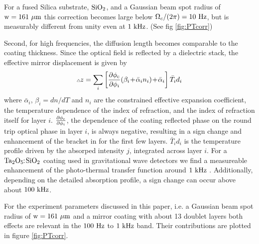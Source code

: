 For a fused Silica substrate, $\rm SiO_2$,  and a Gaussian beam spot radius of ${\rm w}=161~\mu{\rm m}$ this correction becomes large below ${{\Omega}}_c/(2 \pi) = 10~{\rm Hz}$, but is measurably different from unity even at $1~{\rm kHz}$. (See fig \ref{fig:PTcorr})

Second, for high frequencies, the diffusion length becomes comparable to the coating thickness. Since the optical field is reflected by a dielectric stack, the effective mirror displacement is given by \cite{PhysRevD.78.102003,PhysRevD.91.023010}
\begin{equation}
\label{eq:dphic2}
{}_{{}^\triangle}\! z =  \sum_{i}   \left[ \frac{\partial \phi_{\rm c}}{\partial \phi_i} (\beta_i \!+\! \bar{\alpha}_i n_i) 
\!+\!  \bar{\alpha}_i  \right]  \bar{T}_i d_i
\end{equation}
where  $\bar{\alpha}_i$, $\beta_i=dn/dT$ and $n_i$ are the constrained effective expansion coefficient, the temperature dependence of the index of refraction, and the index of refraction itself for layer $i$. $\frac{\partial \phi_{\rm c}}{\partial \phi_i}$, the dependence of the coating reflected phase on the round trip optical phase in layer $i$, is always negative, resulting in a sign change and enhancement of the bracket in  for the first few layers. $\bar{T}_i d_i$ is the temperature profile driven by the absorped intensity $j$, integrated across layer $i$. For a $\rm Ta_2O_5\!\!:\!SiO_2$ coating used in gravitational wave detectors we find a measureable enhancement of the photo-thermal transfer function around $1~{\rm kHz}$ \cite{PhysRevD.91.023010}. Additionally, depending on the detailed absorption profile, a sign change can occur above about $100~{\rm kHz}$.

For the experiment parameters discussed in this paper, i.e. a  Gaussian beam spot radius of ${\rm w}=161~\mu{\rm m}$ and a mirror coating with about 13 doublet layers both effects are relevant in the $100~{\rm Hz}$ to $1~{\rm kHz}$ band. Their contributions are plotted in figure \ref{fig:PTcorr}.

